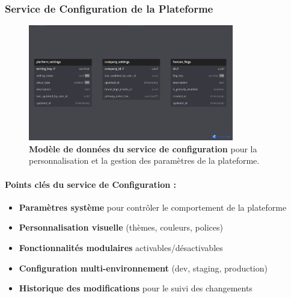 \subsubsection{Service de Configuration de la Plateforme}
\begin{figure}[p]
  \centering
  \includegraphics[width=0.8\textwidth,keepaspectratio]{week_1_img/services_db_screanshots/Screenshot 2025-06-06 at 15-08-44 Platform_Configuration_Service.pdf.png}
  \caption{\textbf{Modèle de données du service de configuration} pour la personnalisation et la gestion des paramètres de la plateforme.}
  \label{fig:config_service}
\end{figure}

\vspace{5pt}
\small
\paragraph{Points clés du service de Configuration :}
\begin{itemize}[leftmargin=*,noitemsep,topsep=0pt]
  \item \textbf{Paramètres système} pour contrôler le comportement de la plateforme
  \item \textbf{Personnalisation visuelle} (thèmes, couleurs, polices)
  \item \textbf{Fonctionnalités modulaires} activables/désactivables
  \item \textbf{Configuration multi-environnement} (dev, staging, production)
  \item \textbf{Historique des modifications} pour le suivi des changements
\end{itemize}
\normalsize
\clearpage

